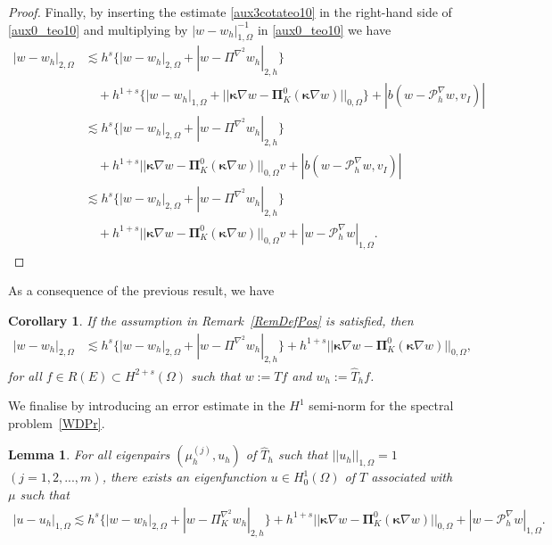 \documentclass[final,reqno]{elsarticle}
\newtheorem{lemma}{Lemma}[section]
\newtheorem{corollary}{Corollary}[section]
\def\bkappa{\boldsymbol{\kappa}}
\def\bPi{\mathbf{\Pi}}
\begin{document}
\begin{proof}
Finally, by inserting the estimate \eqref{aux3cotateo10} in the right-hand side of \eqref{aux0_teo10} and multiplying by $|w-w_h|_{1,\Omega}^{-1}$ in \eqref{aux0_teo10} we have
\begin{align}
|w-w_h|_{2,\Omega}
&\lesssim h^s\Big\{|w-w_h|_{2,\Omega} + |w-\Pi^{\nabla^2}w_h|_{2,h}\Big\} \nonumber \\
& \quad + h^{1+s}\Big\{ |w-w_h|_{1,\Omega} + ||\bkappa \nabla w - \bPi_K^0(\bkappa \nabla w)  ||_{0,\Omega}\Big\} + |b(w-\mathcal{P}_h^\nabla w,v_I)| \nonumber\\
&\lesssim h^s\Big\{|w-w_h|_{2,\Omega} + |w-\Pi^{\nabla^2}w_h|_{2,h} \Big\}\nonumber\\
& \quad + h^{1+s}  ||\bkappa \nabla w - \bPi_K^0(\bkappa \nabla w)  ||_{0,\Omega} v + |b(w-\mathcal{P}_h^\nabla w,v_I)| \nonumber\\
&\lesssim h^s\Big\{|w-w_h|_{2,\Omega} + |w-\Pi^{\nabla^2}w_h|_{2,h} \Big\} \nonumber\\
&\quad + h^{1+s}  ||\bkappa \nabla w - \bPi_K^0(\bkappa \nabla w)  ||_{0,\Omega} v  + |w-\mathcal{P}_h^\nabla w|_{1,\Omega}. \nonumber
\end{align}
\end{proof}
As a consequence of the previous result, we have
\begin{corollary}
If the assumption in Remark~\ref{RemDefPos} is satisfied, then
\begin{align}
|w-w_h|_{2,\Omega}&\lesssim h^s\Big\{|w-w_h|_{2,\Omega} + |w-\Pi^{\nabla^2}w_h|_{2,h} \Big\}+ h^{1+s} ||\bkappa \nabla w - \bPi_K^0(\bkappa \nabla w)  ||_{0,\Omega},
\nonumber
\end{align}
for all $f\in R(E)\subset H^{2+s}(\Omega)$ such that $w:=Tf$ and $w_h:=\widehat{T}_hf$.
\end{corollary}

We finalise by introducing an error estimate in the $H^1$ semi-norm for the spectral problem~\eqref{WDPr}.
\begin{lemma}\label{Lem11ApVEP}
   For all eigenpairs $(\mu_h^{(j)},u_h)$ of $\widehat{T}_h$ such that $||u_h||_{1,\Omega}=1$ $(j=1,2,...,m)$, there exists an eigenfunction $u\in H_0^1(\Omega)$ of $T$ associated with $\mu$ such that
\begin{align*}
|u-u_h|_{1,\Omega}\lesssim h^s\Big\{|w-w_h|_{2,\Omega} + |w-\Pi_K^{\nabla^2}w_h|_{2,h}\Big\}  + h^{1+s}||\bkappa \nabla w - \bPi_K^0(\bkappa \nabla w)  ||_{0,\Omega}   + |w-\mathcal{P}_h^{\nabla} w|_{1,\Omega}.
\end{align*}
\end{lemma}
\end{document}
